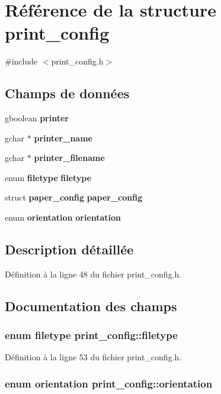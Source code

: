 \section{Référence de la structure print\_\-config}
\label{structprint__config}


{\ttfamily \#include $<$print\_\-config.h$>$}

\subsection*{Champs de données}
\begin{DoxyCompactItemize}
\item 
gboolean {\bf printer}
\item 
gchar $\ast$ {\bf printer\_\-name}
\item 
gchar $\ast$ {\bf printer\_\-filename}
\item 
enum {\bf filetype} {\bf filetype}
\item 
struct {\bf paper\_\-config} {\bf paper\_\-config}
\item 
enum {\bf orientation} {\bf orientation}
\end{DoxyCompactItemize}


\subsection{Description détaillée}


Définition à la ligne 48 du fichier print\_\-config.h.



\subsection{Documentation des champs}
\subsubsection[{filetype}]{\setlength{\rightskip}{0pt plus 5cm}enum {\bf filetype} {\bf print\_\-config::filetype}}\label{structprint__config_aa1dd16d3a4ea1d9ea2e80deafe76948f}


Définition à la ligne 53 du fichier print\_\-config.h.

\subsubsection[{orientation}]{\setlength{\rightskip}{0pt plus 5cm}enum {\bf orientation} {\bf print\_\-config::orientation}}\label{structprint__config_af6c1e368a502dad3fc0fc1a042b99aa4}


